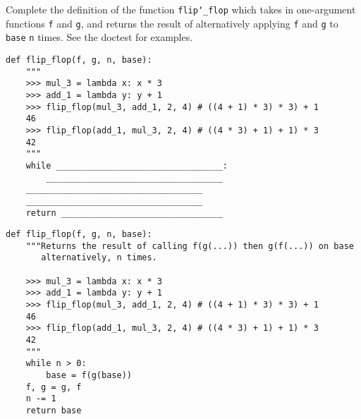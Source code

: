 \begin{blocksection}
\question Complete the definition of the function \texttt{flip\char`_flop} which takes in one-argument functions \texttt{f} and \texttt{g}, and returns the result of alternatively applying \texttt{f} and \texttt{g} to \texttt{base} \texttt{n} times. See the doctest for examples. \\

\begin{lstlisting}
def flip_flop(f, g, n, base):
    """
    >>> mul_3 = lambda x: x * 3
    >>> add_1 = lambda y: y + 1
    >>> flip_flop(mul_3, add_1, 2, 4) # ((4 + 1) * 3) * 3) + 1
    46
    >>> flip_flop(add_1, mul_3, 2, 4) # ((4 * 3) + 1) + 1) * 3
    42
    """
    while _________________________________:
        ___________________________________	
	___________________________________
	___________________________________
    return ________________________________

\end{lstlisting}

\begin{solution}
\begin{lstlisting}
def flip_flop(f, g, n, base):
    """Returns the result of calling f(g(...)) then g(f(...)) on base 
       alternatively, n times.
    
    >>> mul_3 = lambda x: x * 3
    >>> add_1 = lambda y: y + 1
    >>> flip_flop(mul_3, add_1, 2, 4) # ((4 + 1) * 3) * 3) + 1
    46
    >>> flip_flop(add_1, mul_3, 2, 4) # ((4 * 3) + 1) + 1) * 3
    42
    """
    while n > 0:	
        base = f(g(base))	
	f, g = g, f
	n -= 1	
    return base

\end{lstlisting}
\end{solution}
\end{blocksection}
